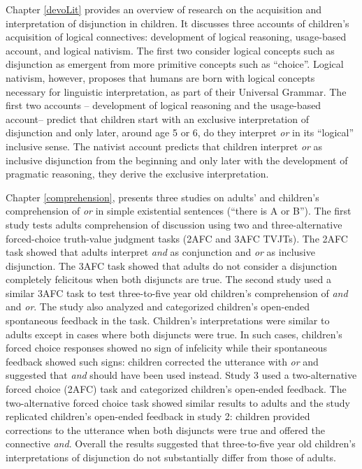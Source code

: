 \documentclass[oneside]{report}
\theoremstyle{definition}
\theoremstyle{definition}
\theoremstyle{definition}
\theoremstyle{remark}
\begin{document}
Chapter \ref{devoLit} provides an overview of research on the
acquisition and interpretation of disjunction in children. It discusses
three accounts of children's acquisition of logical connectives:
development of logical reasoning, usage-based account, and logical
nativism. The first two consider logical concepts such as disjunction as
emergent from more primitive concepts such as ``choice''. Logical
nativism, however, proposes that humans are born with logical concepts
necessary for linguistic interpretation, as part of their Universal
Grammar. The first two accounts -- development of logical reasoning and
the usage-based account-- predict that children start with an exclusive
interpretation of disjunction and only later, around age 5 or 6, do they
interpret \emph{or} in its ``logical'' inclusive sense. The nativist
account predicts that children interpret \emph{or} as inclusive
disjunction from the beginning and only later with the development of
pragmatic reasoning, they derive the exclusive interpretation.

Chapter \ref{comprehension}, presents three studies on adults' and
children's comprehension of \emph{or} in simple existential sentences
(``there is A or B''). The first study tests adults comprehension of
discussion using two and three-alternative forced-choice truth-value
judgment tasks (2AFC and 3AFC TVJTs). The 2AFC task showed that adults
interpret \emph{and} as conjunction and \emph{or} as inclusive
disjunction. The 3AFC task showed that adults do not consider a
disjunction completely felicitous when both disjuncts are true. The
second study used a similar 3AFC task to test three-to-five year old
children's comprehension of \emph{and} and \emph{or}. The study also
analyzed and categorized children's open-ended spontaneous feedback in
the task. Children's interpretations were similar to adults except in
cases where both disjuncts were true. In such cases, children's forced
choice responses showed no sign of infelicity while their spontaneous
feedback showed such signs: children corrected the utterance with
\emph{or} and suggested that \emph{and} should have been used instead.
Study 3 used a two-alternative forced choice (2AFC) task and categorized
children's open-ended feedback. The two-alternative forced choice task
showed similar results to adults and the study replicated children's
open-ended feedback in study 2: children provided corrections to the
utterance when both disjuncts were true and offered the connective
\emph{and}. Overall the results suggested that three-to-five year old
children's interpretations of disjunction do not substantially differ
from those of adults.
\end{document}
